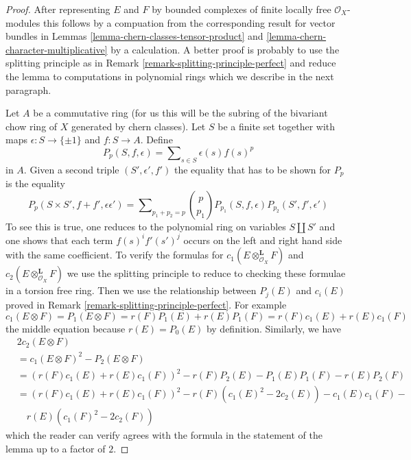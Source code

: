 \begin{proof}
After representing $E$ and $F$ by bounded complexes of finite locally
free $\mathcal{O}_X$-modules this follows by a compuation from the
corresponding result for vector bundles in
Lemmas \ref{lemma-chern-classes-tensor-product} and
\ref{lemma-chern-character-multiplicative} by a calculation.
A better proof is probably to use the splitting principle as in
Remark \ref{remark-splitting-principle-perfect}
and reduce the lemma to computations in polynomial rings 
which we describe in the next paragraph.

\medskip\noindent
Let $A$ be a commutative ring (for us this will be the subring of the
bivariant chow ring of $X$ generated by chern classes).
Let $S$ be a finite set together with maps $\epsilon : S \to \{\pm 1\}$
and $f : S \to A$. Define
$$
P_p(S, f , \epsilon) = \sum\nolimits_{s \in S} \epsilon(s) f(s)^p
$$
in $A$. Given a second triple $(S', \epsilon', f')$
the equality that has to be shown for $P_p$ is the equality
$$
P_p(S \times S', f + f' , \epsilon \epsilon') = 
\sum\nolimits_{p_1 + p_2 = p}
{p \choose p_1} P_{p_1}(S, f, \epsilon) P_{p_2}(S', f', \epsilon')
$$
To see this is true, one reduces to the polynomial ring on variables
$S \amalg S'$ and one shows that each term $f(s)^if'(s')^j$ occurs
on the left and right hand side with the same coefficient.
To verify the formulas for $c_1(E \otimes_{\mathcal{O}_X}^\mathbf{L} F)$
and $c_2(E \otimes_{\mathcal{O}_X}^\mathbf{L} F)$ we use the splitting
principle to reduce to checking these formulae in a torsion free ring.
Then we use the relationship between $P_j(E)$ and $c_i(E)$ proved
in Remark \ref{remark-splitting-principle-perfect}. For example
$$
c_1(E \otimes F) = P_1(E \otimes F) = r(F)P_1(E) + r(E)P_1(F) =
r(F)c_1(E) + r(E)c_1(F)
$$
the middle equation because $r(E) = P_0(E)$ by definition. Similarly, we have
\begin{align*}
& 2c_2(E \otimes F) \\
& = c_1(E \otimes F)^2 - P_2(E \otimes F) \\
& =
(r(F)c_1(E) + r(E)c_1(F))^2 -
r(F)P_2(E) - P_1(E)P_1(F) - r(E)P_2(F) \\
& =
(r(F)c_1(E) + r(E)c_1(F))^2 -
r(F)(c_1(E)^2 - 2c_2(E)) - c_1(E)c_1(F) - \\
& \quad r(E)(c_1(F)^2 - 2c_2(F))
\end{align*}
which the reader can verify agrees with the formula in the statement
of the lemma up to a factor of $2$.
\end{proof}







